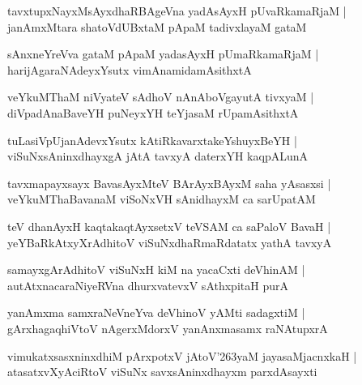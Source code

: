 \documentclass[twoside,12pt,openright]{book}
\def\S{\char'263}
\newcounter{shloka}[chapter]
\begin{document}
\begin{shloka}%
tavxtupxNayxMsAyxdhaRBAgeVna yadAsAyxH pUvaRkamaRjaM |\\
janAmxMtara shatoVdUBxtaM pApaM tadivxlayaM gataM 
\end{shloka}

\begin{shloka}%
sAnxneYreVva gataM pApaM yadasAyxH pUmaRkamaRjaM |\\
harijAgaraNAdeyxYsutx vimAnamidamAsithxtA
\end{shloka}

\begin{shloka}%
veYkuMThaM niVyateV sAdhoV nAnAboVgayutA tivxyaM |\\
diVpadAnaBaveYH puNeyxYH teYjasaM rUpamAsithxtA 
\end{shloka}

\begin{shloka}%
tuLasiVpUjanAdevxYsutx kAtiRkavarxtakeYshuyxBeYH |\\
viSuNxsAninxdhayxgA jAtA tavxyA daterxYH kaqpALunA 
\end{shloka}

\begin{shloka}%
tavxmapayxsayx BavasAyxMteV BArAyxBAyxM saha yAsasxsi |\\
veYkuMThaBavanaM viSoNxVH sAnidhayxM ca sarUpatAM 
\end{shloka}

\begin{shloka}%
teV dhanAyxH kaqtakaqtAyxsetxV teVSAM ca saPaloV BavaH |\\
yeYBaRkAtxyXrAdhitoV viSuNxdhaRmaRdatatx yathA tavxyA 
\end{shloka}

\begin{shloka}%
samayxgArAdhitoV viSuNxH kiM na yacaCxti deVhinAM |\\
autAtxnacaraNiyeRVna dhurxvatevxV sAthxpitaH purA
\end{shloka}

\begin{shloka}%
yanAmxma samxraNeVneYva deVhinoV yAMti sadagxtiM |\\
gArxhagaqhiVtoV nAgerxMdorxV yanAnxmasamx raNAtupxrA 
\end{shloka}

\begin{shloka}%
vimukatxsasxninxdhiM pArxpotxV jAtoV\S yaM jayasaMjacnxkaH |\\
atasatxvXyAciRtoV viSuNx savxsAninxdhayxm parxdAsayxti 
\end{shloka}
\end{document}
